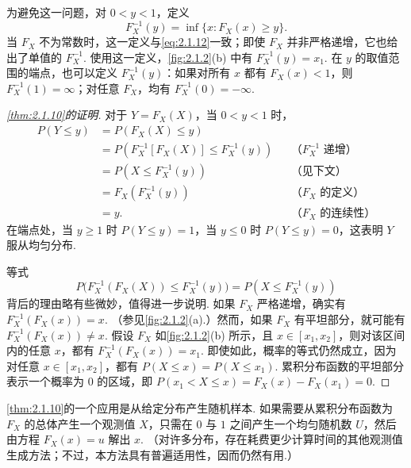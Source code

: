 为避免这一问题，对 $0<y<1$，定义
\begin{equation}\label{eq:2.1.13}
F_X^{-1}(y)=\inf\{x:F_X(x)\ge y\}.
\end{equation}
当 $F_X$ 不为常数时，这一定义与\eqref{eq:2.1.12}一致；即使 $F_X$ 并非严格递增，它也给出了单值的 $F_X^{-1}$. 使用这一定义，\autoref{fig:2.1.2}(b) 中有 $F_X^{-1}(y)=x_1$. 在 $y$ 的取值范围的端点，也可以定义 $F_X^{-1}(y)$：如果对所有 $x$ 都有 $F_X(x)<1$，则 $F_X^{-1}(1)=\infty$；对任意 $F_X$，均有 $F_X^{-1}(0)=-\infty$.

\begin{proof}[\autoref{thm:2.1.10}的证明]
对于 $Y=F_X(X)$，当 $0<y<1$ 时，
$$\begin{aligned}
P(Y\le y)&=P(F_X(X)\le y)\\
&=P(F_X^{-1}[F_X(X)]\le F_X^{-1}(y))&&\text{（$F_X^{-1}$ 递增）}\\
&=P(X\le F_X^{-1}(y))&&\text{（见下文）}\\
&=F_X(F_X^{-1}(y))&&\text{（$F_X$ 的定义）}\\
&=y.&&\text{（$F_X$ 的连续性）}
\end{aligned}$$
在端点处，当 $y\ge1$ 时 $P(Y\le y)=1$，当 $y\le0$ 时 $P(Y\le y)=0$，这表明 $Y$ 服从均匀分布.

等式
$$P\bigl(F_X^{-1}(F_X(X))\le F_X^{-1}(y)\bigr)=P(X\le F_X^{-1}(y))$$
背后的理由略有些微妙，值得进一步说明. 如果 $F_X$ 严格递增，确实有 $F_X^{-1}(F_X(x))=x$. （参见\autoref{fig:2.1.2}(a).）然而，如果 $F_X$ 有平坦部分，就可能有 $F_X^{-1}(F_X(x))\ne x$. 假设 $F_X$ 如\autoref{fig:2.1.2}(b) 所示，且 $x\in[x_1,x_2]$，则对该区间内的任意 $x$，都有 $F_X^{-1}(F_X(x))=x_1$.
即使如此，概率的等式仍然成立，因为对任意 $x\in[x_1,x_2]$，都有 $P(X\le x)=P(X\le x_1)$. 累积分布函数的平坦部分表示一个概率为 $0$ 的区域，即 $P(x_1<X\le x)=F_X(x)-F_X(x_1)=0$.
\end{proof}

\autoref{thm:2.1.10}的一个应用是从给定分布产生随机样本. 如果需要从累积分布函数为 $F_X$ 的总体产生一个观测值 $X$，只需在 $0$ 与 $1$ 之间产生一个均匀随机数 $U$，然后由方程 $F_X(x)=u$ 解出 $x$. （对许多分布，存在耗费更少计算时间的其他观测值生成方法；不过，本方法具有普遍适用性，因而仍然有用.）
